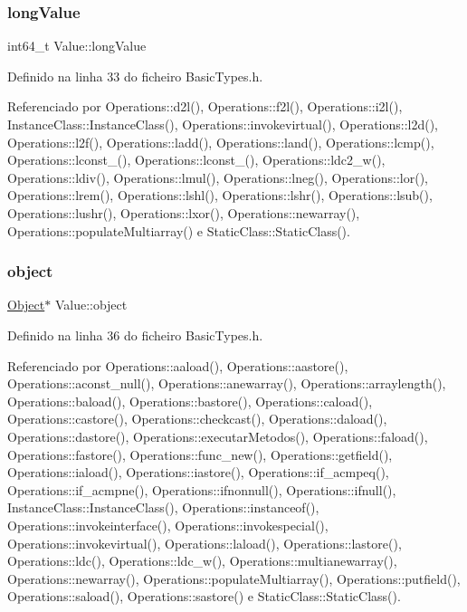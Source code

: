 \subsubsection{\texorpdfstring{long\+Value}{longValue}}
{\footnotesize\ttfamily int64\+\_\+t Value\+::long\+Value}



Definido na linha 33 do ficheiro Basic\+Types.\+h.



Referenciado por Operations\+::d2l(), Operations\+::f2l(), Operations\+::i2l(), Instance\+Class\+::\+Instance\+Class(), Operations\+::invokevirtual(), Operations\+::l2d(), Operations\+::l2f(), Operations\+::ladd(), Operations\+::land(), Operations\+::lcmp(), Operations\+::lconst\+\_(), Operations\+::lconst\+\_(), Operations\+::ldc2\+\_\+w(), Operations\+::ldiv(), Operations\+::lmul(), Operations\+::lneg(), Operations\+::lor(), Operations\+::lrem(), Operations\+::lshl(), Operations\+::lshr(), Operations\+::lsub(), Operations\+::lushr(), Operations\+::lxor(), Operations\+::newarray(), Operations\+::populate\+Multiarray() e Static\+Class\+::\+Static\+Class().

\mbox{\label{structValue_a39c8a4a3203f603f82f1c80561bc735b}} 
\subsubsection{\texorpdfstring{object}{object}}
{\footnotesize\ttfamily \hyperlink{classObject}{Object}$\ast$ Value\+::object}



Definido na linha 36 do ficheiro Basic\+Types.\+h.



Referenciado por Operations\+::aaload(), Operations\+::aastore(), Operations\+::aconst\+\_\+null(), Operations\+::anewarray(), Operations\+::arraylength(), Operations\+::baload(), Operations\+::bastore(), Operations\+::caload(), Operations\+::castore(), Operations\+::checkcast(), Operations\+::daload(), Operations\+::dastore(), Operations\+::executar\+Metodos(), Operations\+::faload(), Operations\+::fastore(), Operations\+::func\+\_\+new(), Operations\+::getfield(), Operations\+::iaload(), Operations\+::iastore(), Operations\+::if\+\_\+acmpeq(), Operations\+::if\+\_\+acmpne(), Operations\+::ifnonnull(), Operations\+::ifnull(), Instance\+Class\+::\+Instance\+Class(), Operations\+::instanceof(), Operations\+::invokeinterface(), Operations\+::invokespecial(), Operations\+::invokevirtual(), Operations\+::laload(), Operations\+::lastore(), Operations\+::ldc(), Operations\+::ldc\+\_\+w(), Operations\+::multianewarray(), Operations\+::newarray(), Operations\+::populate\+Multiarray(), Operations\+::putfield(), Operations\+::saload(), Operations\+::sastore() e Static\+Class\+::\+Static\+Class().

